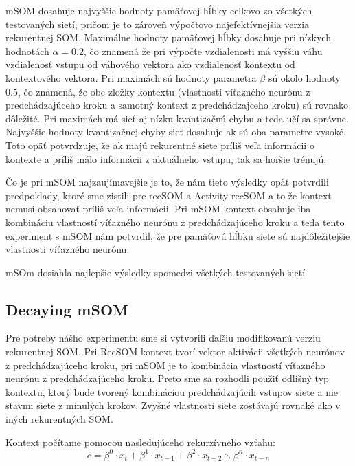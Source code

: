  mSOM dosahuje najvyššie hodnoty pamäťovej hĺbky celkovo zo všetkých testovaných sietí, pričom je to zároveň 
 výpočtovo najefektívnejšia verzia rekurentnej SOM. 
 Maximálne hodnoty pamäťovej hĺbky dosahuje pri nízkych hodnotách $\alpha = 0.2 $, čo znamená že pri výpočte vzdialenosti má vyššiu váhu vzdialenosť vstupu od 
 váhového vektora ako vzdialenosť kontextu od kontextového vektora. 
 Pri maximách sú hodnoty parametra $\beta$ sú okolo hodnoty $0.5$, čo znamená, že obe zložky kontextu 
 (vlastnosti víťazného neurónu z predchádzajúceho kroku a samotný kontext z predchádzajceho kroku) sú rovnako dôležité.
 Pri maximách má sieť aj nízku kvantizačnú chybu a teda učí sa správne. 
 Najvyššie hodnoty kvantizačnej chyby sieť dosahuje ak sú oba parametre vysoké. Toto opäť potvrdzuje, že ak majú rekurentné
 siete príliš veľa informácii o kontexte a príliš málo informácii z aktuálneho vstupu, tak sa horšie trénujú.


 Čo je pri mSOM najzaujímavejšie je to, že nám tieto výsledky opäť potvrdili predpoklady, ktoré sme zistili pre recSOM a Activity recSOM a to že
 kontext nemusí obsahovať príliš veľa informácii. Pri mSOM kontext obsahuje iba kombináciu vlastností víťazného neurónu z predchádzajúceho kroku a teda tento 
 experiment s mSOM nám potvrdil, že pre pamäťovú hĺbku siete sú najdôležitejšie vlastnosti víťazného neurónu.

 mSOm dosiahla najlepšie výsledky spomedzi všetkých testovaných sietí.



\subsection{Decaying mSOM}
Pre potreby nášho experimentu sme si vytvorili ďaľšiu modifikovanú verziu %
rekurentnej SOM. Pri RecSOM kontext tvorí vektor aktivácii všetkých neurónov z predchádzajúceho kroku, 
pri mSOM je to kombinácia vlastností víťazného neurónu z predchádzajúceho kroku. 
Preto sme sa rozhodli použiť odlišný typ kontextu, ktorý bude tvorený kombináciou predchádzajúcih vstupov 
siete a nie stavmi siete z minulých krokov.
Zvyšné vlastnosti siete zostávajú rovnaké ako v iných rekurentných SOM.

Kontext počítame pomocou nasledujúceho rekurzívneho vzťahu:
\begin{equation}
	c = \beta^{0} \cdot x_{t} + \beta^{1} \cdot x_{t-1} + 
	\beta^{2} \cdot x_{t-2} \ddots \beta^{n} \cdot x_{t-n}
\end{equation}

